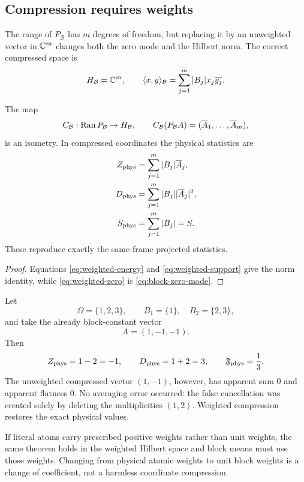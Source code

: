 \subsection{Compression requires weights}

The range of \(P_{\mathcal B}\) has \(m\) degrees of freedom, but
replacing it by an unweighted vector in \(\mathbb C^m\) changes both the
zero mode and the Hilbert norm.  The correct compressed space is
\[
 H_{\mathcal B}
 =
 \mathbb C^m,\qquad
 \langle x,y\rangle_{\mathcal B}
 =
 \sum_{j=1}^m |B_j|x_j\overline{y_j}.
\]

\begin{proposition}
\label{prop:weighted-compression}
The map
\[
 C_{\mathcal B}:\operatorname{Ran} P_{\mathcal B}\to H_{\mathcal B},
\qquad
 C_{\mathcal B}(P_{\mathcal B}A)
 =
 (\overline A_1,\ldots,\overline A_m),
\]
is an isometry.  In compressed coordinates the physical statistics
are
\begin{align}
 Z_{\rm phys}
 &=
 \sum_{j=1}^m |B_j|\overline A_j,
\label{eq:weighted-zero}\\
 D_{\rm phys}
 &=
 \sum_{j=1}^m |B_j||\overline A_j|^2,
\label{eq:weighted-energy}\\
 S_{\rm phys}
 &=
 \sum_{j=1}^m |B_j|=S.
\label{eq:weighted-support}
\end{align}
These reproduce exactly the same-frame projected statistics.
\end{proposition}

\begin{proof}
Equations \eqref{eq:weighted-energy} and
\eqref{eq:weighted-support} give the norm identity, while
\eqref{eq:weighted-zero} is \eqref{eq:block-zero-mode}.
\end{proof}

\begin{example}
\label{ex:unweighted-false-cancellation}
Let
\[
 \Omega=\{1,2,3\},\qquad
 B_1=\{1\},\quad B_2=\{2,3\},
\]
and take the already block-constant vector
\[
 A=(1,-1,-1).
\]
Then
\[
 Z_{\rm phys}=1-2=-1,\qquad
 D_{\rm phys}=1+2=3,\qquad
 \mathfrak F_{\rm phys}=\frac13.
\]
The unweighted compressed vector \((1,-1)\), however, has apparent
sum \(0\) and apparent flatness \(0\).  No averaging error occurred:
the false cancellation was created solely by deleting the
multiplicities \((1,2)\).  Weighted compression restores the exact
physical values.
\end{example}

\begin{remark}
\label{rem:atomic-normalization}
If literal atoms carry prescribed positive weights rather than unit
weights, the same theorem holds in the weighted Hilbert space and
block means must use those weights.  Changing from physical atomic
weights to unit block weights is a change of coefficient, not a
harmless coordinate compression.
\end{remark}
